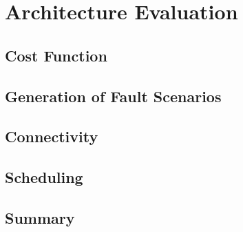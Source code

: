 \chapter{Architecture Evaluation}

\section{Cost Function}

\section{Generation of Fault Scenarios}

\section{Connectivity}

\section{Scheduling}

\section{Summary}